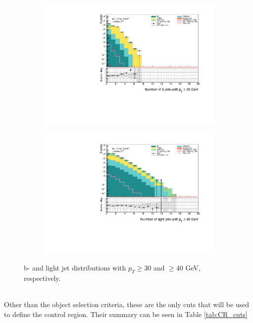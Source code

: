 \documentclass[12pt, a4paper]{book}
\begin{document}
\begin{figure}[!ht]
    \centering
    \hfill\begin{subfigure}[b]{0.49\textwidth}
        \centering
        \includegraphics[width=\textwidth]{bjetsPt30.pdf}
    \end{subfigure}
    \hfill\begin{subfigure}[b]{0.49\textwidth}
        \centering
        \includegraphics[width=\textwidth]{ljetsPt40.pdf}
    \end{subfigure}
    \caption[b- and light jet distributions in control region]{b- and light jet distributions with $p_T \ge30$ and $\ge40$ GeV, respectively.}\label{fig:jetcuts}
\end{figure}
\\Other than the object selection criteria, these are the only cuts that will be used to define the control region. Their summary can be seen in Table \ref{tab:CR_cuts}
\end{document}
